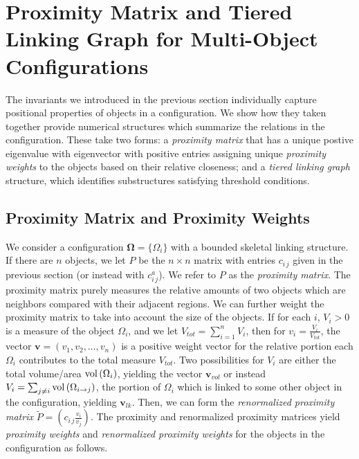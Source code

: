 \documentclass[10pt]{amsart}
\theoremstyle{definition}
\theoremstyle{definition}
\numberwithin{equation}{section}
\newcommand{\vol}{{\rm vol}\,}
\def \bv {\mathbf {v}}
\def \bgW {\boldsymbol \Omega}
\def \gW {\Omega}
\begin{document}
\section{Proximity Matrix and Tiered Linking Graph for Multi-Object 
Configurations}
\label{SecII:TierGrph.PxoxMatr}
The invariants we introduced in the previous section individually capture 
positional properties of objects in a configuration.  We show how they 
taken together provide numerical structures which summarize the 
relations in the configuration.  These take two forms: a {\em proximity 
matrix} that has a unique postive eigenvalue with eigenvector with 
positive entries assigning unique {\em proximity weights} to the objects 
based on their relative closeness; and a {\em tiered linking graph} 
structure, which identifies substructures satisfying threshold conditions.  
\subsection*{Proximity Matrix and Proximity Weights}
\par
We consider a configuration $\bgW = \{ \gW_i\}$ with a bounded skeletal 
linking structure.  If there are $n$ objects,  we let $P$ be the $n \times n$ 
matrix with entries $c_{i\, j}$ given in the previous section (or instead 
with $c^a_{i\, j}$).  We refer to $P$ as the {\em proximity matrix}.  The 
proximity matrix purely measures the relative amounts of two objects 
which are neighbors compared with their adjacent regions. We can further 
weight the proximity matrix to take into account the size of the objects.  
If for each $i$, $V_i > 0$ is a measure of the object $\gW_i$, and we let 
$V_{tot} = \sum_{i = 1}^{n} V_i$, then for $v_i = \frac{V_i}{V_{tot}}$, the 
vector $\bv = (v_1, v_2, \dots , v_n)$ is a positive weight vector for the 
relative portion each $\gW_i$ contributes to the total measure $V_{tot}$.  
Two possibilities for $V_i$ are either the total volume/area 
$\vol(\gW_i)$, yielding the vector $\bv_{vol}$ or instead $V_i = \sum_{j 
\neq i}\vol(\gW_{i \to j})$, the portion of $\gW_i$ which is linked to 
some other object in the configuration, yielding $\bv_{lk}$.  Then, we can 
form the { \em renormalized proximity matrix} $\tilde P = (c_{i\, 
j}\frac{v_i}{v_j})$.  The proximity and renormalized proximity matrices 
yield {\em proximity weights} and {\em renormalized proximity weights} 
for the objects in the configuration as follows.
\end{document}
